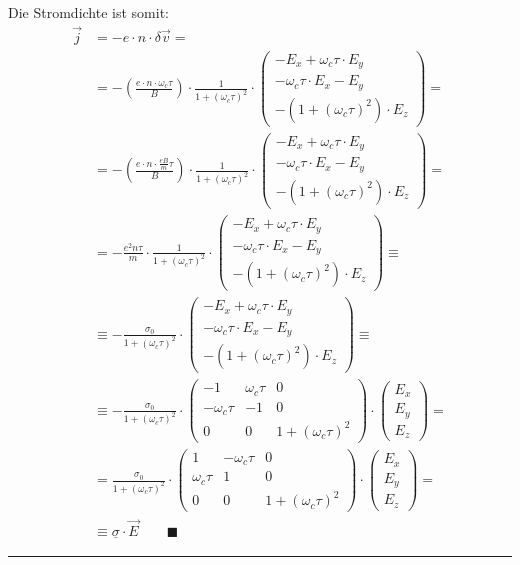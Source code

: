 \documentclass{article}
\newcommand{\lr}[1]{\left(#1\right)}
\begin{document}
{\newpage


	Die Stromdichte ist somit:
		\begin{align*}
			\vec{j} &= - e \cdot n \cdot \delta\vec{v} = \\
			&= - \lr{ \frac{e \cdot n \cdot \omega_c\tau}{B} } \cdot \frac{1}{1 + (\omega_c\tau)^2} \cdot
			\begin{pmatrix}
				-E_x + \omega_c\tau \cdot E_y \\
				-\omega_c\tau \cdot E_x - E_y \\
				-(1 + (\omega_c\tau)^2) \cdot E_z
			\end{pmatrix} = \\
			&= - \lr{ \frac{e \cdot n \cdot \frac{eB}{m}\tau}{B} } \cdot \frac{1}{1 + (\omega_c\tau)^2} \cdot
			\begin{pmatrix}
				-E_x + \omega_c\tau \cdot E_y \\
				-\omega_c\tau \cdot E_x - E_y \\
				-(1 + (\omega_c\tau)^2) \cdot E_z
			\end{pmatrix} = \\
			&= - \frac{e^2 n \tau}{m} \cdot \frac{1}{1 + (\omega_c\tau)^2} \cdot
			\begin{pmatrix}
				-E_x + \omega_c\tau \cdot E_y \\
				-\omega_c\tau \cdot E_x - E_y \\
				-(1 + (\omega_c\tau)^2) \cdot E_z
			\end{pmatrix} \equiv \\
			&\equiv - \frac{\sigma_0}{1 + (\omega_c\tau)^2} \cdot 
			\begin{pmatrix}
				-E_x + \omega_c\tau \cdot E_y \\
				-\omega_c\tau \cdot E_x - E_y \\
				-(1 + (\omega_c\tau)^2) \cdot E_z
			\end{pmatrix} \equiv \\
			&\equiv -\frac{\sigma_0}{1 + (\omega_c\tau)^2} \cdot
			\begin{pmatrix}
				-1 & \omega_c\tau & 0 \\
				-\omega_c\tau & -1 & 0 \\
				0 & 0 & 1 + (\omega_c\tau)^2
			\end{pmatrix}
			\cdot
			\begin{pmatrix}
				E_x \\ E_y \\ E_z
			\end{pmatrix} = \\
			&= \frac{\sigma_0}{1 + (\omega_c\tau)^2} \cdot
			\begin{pmatrix}
				1 & -\omega_c\tau & 0 \\
				\omega_c\tau & 1 & 0 \\
				0 & 0 & 1 + (\omega_c\tau)^2
			\end{pmatrix}
			\cdot
			\begin{pmatrix}
				E_x \\ E_y \\ E_z
			\end{pmatrix} = \\
			& \equiv \underline{\sigma} \cdot \vec{E} \qquad \blacksquare
		\end{align*}
\hrule
}
\end{document}
